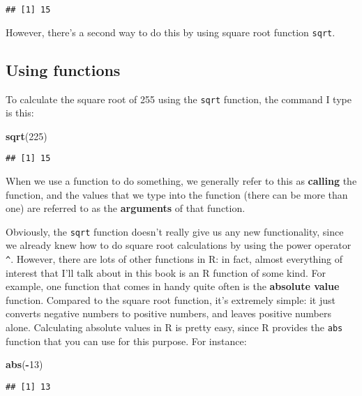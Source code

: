 \documentclass[]{book}
\newenvironment{Shaded}{\begin{snugshade}}{\end{snugshade}}
\newcommand{\DecValTok}[1]{\textcolor[rgb]{0.00,0.00,0.81}{#1}}
\newcommand{\KeywordTok}[1]{\textcolor[rgb]{0.13,0.29,0.53}{\textbf{#1}}}
\newcommand{\NormalTok}[1]{#1}
\newcommand{\OperatorTok}[1]{\textcolor[rgb]{0.81,0.36,0.00}{\textbf{#1}}}
\begin{document}
\begin{verbatim}
## [1] 15
\end{verbatim}

However, there's a second way to do this by using square root function \texttt{sqrt}.

\hypertarget{using-functions}{%
\subsection{Using functions}\label{using-functions}}

To calculate the square root of 255 using the \texttt{sqrt} function, the command I type is this:

\begin{Shaded}
\begin{Highlighting}[]
\KeywordTok{sqrt}\NormalTok{(}\DecValTok{225}\NormalTok{)}
\end{Highlighting}
\end{Shaded}

\begin{verbatim}
## [1] 15
\end{verbatim}

When we use a function to do something, we generally refer to this as \textbf{calling} the function, and the values that we type into the function (there can be more than one) are referred to as the \textbf{arguments} of that function.

Obviously, the \texttt{sqrt} function doesn't really give us any new functionality, since we already knew how to do square root calculations by using the power operator \texttt{\^{}}. However, there are lots of other functions in R: in fact, almost everything of interest that I'll talk about in this book is an R function of some kind. For example, one function that comes in handy quite often is the \textbf{absolute value} function. Compared to the square root function, it's extremely simple: it just converts negative numbers to positive numbers, and leaves positive numbers alone. Calculating absolute values in R is pretty easy, since R provides the \texttt{abs} function that you can use for this purpose. For instance:

\begin{Shaded}
\begin{Highlighting}[]
 \KeywordTok{abs}\NormalTok{(}\OperatorTok{-}\DecValTok{13}\NormalTok{)}
\end{Highlighting}
\end{Shaded}

\begin{verbatim}
## [1] 13
\end{verbatim}
\end{document}
